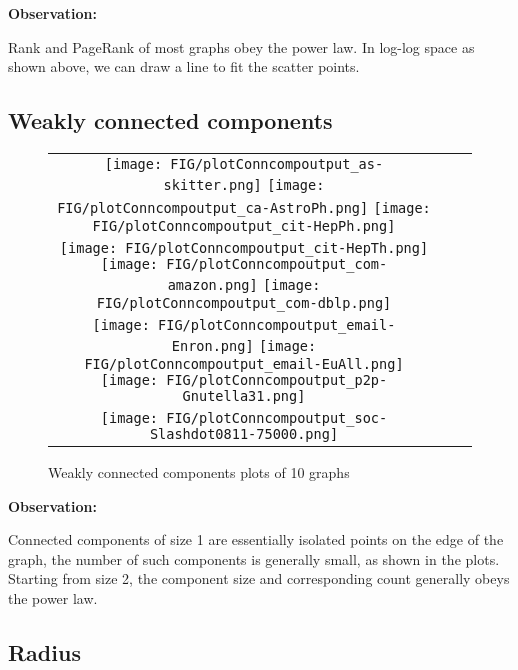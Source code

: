 \textbf{Observation:}
\par Rank and PageRank of most graphs obey the power law. In log-log space as shown above, we can draw a line to fit the scatter points.

\subsection{Weakly connected components}

\begin{figure}[H]
\begin{center}
\begin{tabular}{ccc}
     \texttt{[image: FIG/plotConncompoutput\_as-skitter.png]} 
     \texttt{[image: FIG/plotConncompoutput\_ca-AstroPh.png]}
     \texttt{[image: FIG/plotConncompoutput\_cit-HepPh.png]} \\
     \texttt{[image: FIG/plotConncompoutput\_cit-HepTh.png]} 
     \texttt{[image: FIG/plotConncompoutput\_com-amazon.png]} 
     \texttt{[image: FIG/plotConncompoutput\_com-dblp.png]} \\
     \texttt{[image: FIG/plotConncompoutput\_email-Enron.png]} 
     \texttt{[image: FIG/plotConncompoutput\_email-EuAll.png]} 
     \texttt{[image: FIG/plotConncompoutput\_p2p-Gnutella31.png]} \\
     \texttt{[image: FIG/plotConncompoutput\_soc-Slashdot0811-75000.png]} 
\end{tabular}
\caption{Weakly connected components plots of 10 graphs}
\label{fig:results}
\end{center}
\end{figure}

\textbf{Observation:}
\par Connected components of size 1 are essentially isolated points on the edge of the graph, the number of such components is generally small, as shown in the plots. Starting from size 2, the component size and corresponding count generally obeys the power law.

\subsection{Radius}

